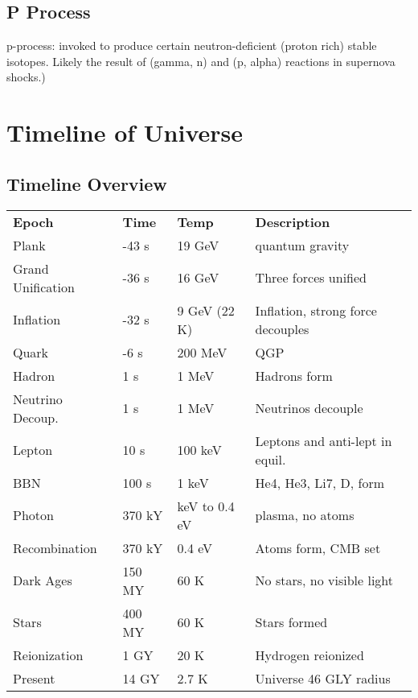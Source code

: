         \subsection{P Process}
            p-process: invoked to produce certain neutron-deficient (proton rich) stable isotopes. Likely the result of (gamma, n) and (p, alpha) reactions in supernova shocks.)
    \section{Timeline of Universe}
        \subsection{Timeline Overview}
            \begin{table}[H]
                \centering
                    \begin{tabular}{llll}
                        \textbf{Epoch}       &       \textbf{Time}        &       \textbf{Temp}        &       \textbf{Description}\\
                        Plank       &       -43 s       &       19 GeV      &       quantum gravity\\
                        Grand Unification & -36 s       &       16 GeV      &       Three forces unified\\
                        Inflation       &   -32 s       &       9 GeV (22 K)      & Inflation, strong force decouples\\
                        Quark       &       -6 s        &       200 MeV     &       QGP \\
                        Hadron      &       1 s         &       1 MeV       &       Hadrons form\\
                        Neutrino Decoup.    & 1 s       &       1 MeV       &       Neutrinos decouple\\
                        Lepton      &       10 s        &       100 keV     &       Leptons and anti-lept in equil.\\
                        BBN         &       100 s       &       1 keV       &       He4, He3, Li7, D, form\\
                        Photon      &       370 kY      &       keV to 0.4 eV      &       plasma, no atoms\\
                        Recombination &     370 kY      &       0.4 eV      &       Atoms form, CMB set\\
                        Dark Ages   &       150 MY      &       60 K        &       No stars, no visible light\\
                        Stars       &       400 MY      &       60 K        &       Stars formed\\
                        Reionization &       1 GY        &       20 K        &       Hydrogen reionized        \\
                        Present     &       14 GY       &       2.7 K       &       Universe 46 GLY radius\\
                    \end{tabular}
            \end{table}
            
